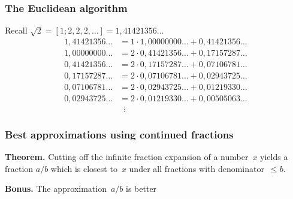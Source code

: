 \documentclass[12pt,compress,english,utf8,t]{beamer}
\begin{document}
\begin{frame}\frametitle{The Euclidean algorithm}
  Recall $\sqrt{2} = [1; 2, 2, 2, \ldots] = 1{,}41421356\ldots$
  \begin{align*}
    1{,}41421356\ldots &= 1 \cdot 1{,}00000000\ldots + 0{,}41421356\ldots \\
    1{,}00000000\ldots &= 2 \cdot 0{,}41421356\ldots + 0{,}17157287\ldots \\
    0{,}41421356\ldots &= 2 \cdot 0{,}17157287\ldots + 0{,}07106781\ldots \\
    0{,}17157287\ldots &= 2 \cdot 0{,}07106781\ldots + 0{,}02943725\ldots \\
    0{,}07106781\ldots &= 2 \cdot 0{,}02943725\ldots + 0{,}01219330\ldots \\
    0{,}02943725\ldots &= 2 \cdot 0{,}01219330\ldots + 0{,}00505063\ldots \\
    &\,\,\,\vdots
  \end{align*}
\end{frame}

\begin{frame}\frametitle{Best approximations using continued fractions}
  \textbf{Theorem.} Cutting off the infinite fraction expansion of a number~$x$
  yields a fraction $a/b$ which is closest to~$x$ under all fractions with
  denominator~$\leq b$.
  \medskip
  \pause

  \textbf{Bonus.} The approximation~$a/b$ is %
  better %
\end{frame}
\end{document}
